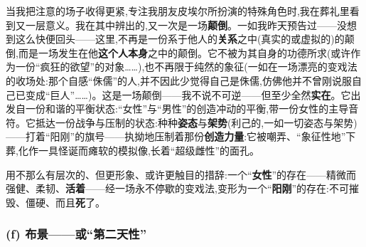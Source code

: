 当我把注意的场子收得更紧,专注我朋友皮埃尔所扮演的特殊角色时,我在葬礼里看到又一层意义。我在其中辨出的,又一次是一场\textbf{颠倒}。一如我昨天预告过——没想到这么快便回头——这里,不再是一份系于他人的\textbf{关系}之中(真实的或虚拟的)的颠倒,而是一场发生在他\textbf{这个人本身}之中的颠倒。它不被为其自身的功德所求(或许作为一份“疯狂的欲望”的对象……),也不再限于纯然的象征(一如在一场漂亮的变戏法的收场处:那个自感“侏儒”的人,并不因此少觉得自己是侏儒,仿佛他并不曾刚说服自己已变成“巨人”……)。这是一场颠倒——我不说不可逆——但至少全然\textbf{实在}。它出发自一份和谐的平衡状态:“女性”与“男性”的创造冲动\dmark{}的平衡,带一份女性的主导音符。它抵达一份战争与压制的状态:种种\textbf{姿态}与\textbf{架势}(利己的,一如一切姿态与架势)——打着“阳刚”的旗号——执拗地压制着那份\textbf{创造力量}:它被嘲弄、“象征性地”下葬,化作一具怪诞而瘫软的模拟像,长着“超级雌性”的面孔。

用不那么有层次的、但更形象、或许更触目的措辞:一个“\textbf{女性}”的存在——精微而强健、柔韧、\textbf{活着}——经一场永不停歇的变戏法,变形为一个“\textbf{阳刚}”的存在:不可摧毁、僵硬、而且\textbf{死}了。

\subsubsection*{(f) 布景——或“第二天性”}
\label{ch18:local:h67}

\label{ch18:local:n62}

